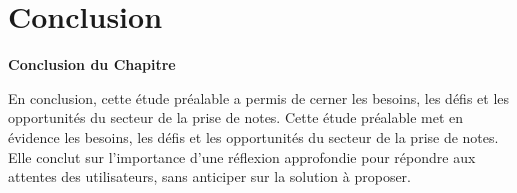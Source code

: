 \section{Conclusion}


\vspace{1cm}
\begin{center}
\textbf{\large Conclusion du Chapitre}
\end{center}

\noindent
En conclusion, cette étude préalable a permis de cerner les besoins, les défis et les opportunités du secteur de la prise de notes. Cette étude préalable met en évidence les besoins, les défis et les opportunités du secteur de la prise de notes. Elle conclut sur l'importance d'une réflexion approfondie pour répondre aux attentes des utilisateurs, sans anticiper sur la solution à proposer.